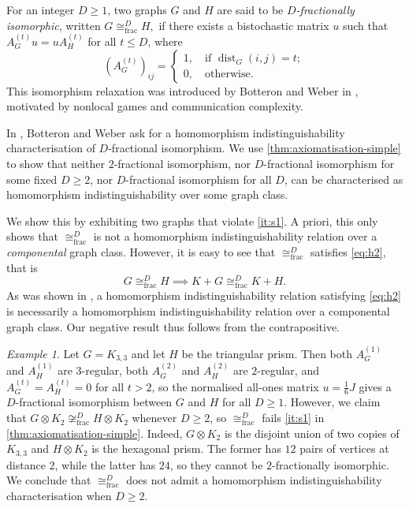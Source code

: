 \documentclass[11pt]{scrartcl}
\theoremstyle{definition}
\theoremstyle{plain}
\theoremstyle{remark}
\newtheorem{plainexample}[definition]{Example}
\newcommand{\opfrac}{{\operatorname{frac}}}
\DeclareMathOperator{\dist}{dist}
\begin{document}
    For an integer $D \geq 1$, two graphs $G$ and $H$ are said to be \emph{$D$-fractionally isomorphic}, written $G \cong_\opfrac^D H,$ if there exists a bistochastic matrix $u$ such that $A_G^{(t)} u = u A_H^{(t)}$ for all $t \leq D$, where
	\[ (A_G^{(t)})_{ij} = \begin{cases}
		1, \quad \text{if $\dist_G(i,j) = t$}; \\
		0, \quad \text{otherwise}.
	\end{cases} \]
    This isomorphism relaxation was introduced by Botteron and Weber in \cite{botteron_communication_2024}, motivated by nonlocal games and communication complexity.

	In \cite[Open Question 2]{botteron_communication_2024}, Botteron and Weber ask for a homomorphism indistinguishability characterisation of $D$\nobreakdash-fractional isomorphism.
	We use \cref{thm:axiomatisation-simple} to show that neither $2$\nobreakdash-fractional isomorphism, nor $D$\nobreakdash-fractional isomorphism for some fixed $D \geq 2$, nor $D$-fractional isomorphism for all $D$, can be characterised as homomorphism indistinguishability over some graph class.
    
    We show this by exhibiting two graphs that violate \cref{it:s1}. A priori, this only shows that $\cong_\opfrac^D$ is not a homomorphism indistinguishability relation over a \emph{componental} graph class. However, it is easy to see that $\cong_\opfrac^D$ satisfies \cref{eq:h2}, that is
    \begin{equation*}
        G \cong_\opfrac^D H \implies K + G \cong_\opfrac^D K + H.
    \end{equation*}
    As was shown in \cite[Theorem~7]{seppelt_logical_2024}, a homomorphism indistinguishability relation satisfying \cref{eq:h2} is necessarily a homomorphism indistinguishability relation over a componental graph class. Our negative result thus follows from the contrapositive.
	
	\begin{plainexample}
		\label{xmpl:D-frac}
		Let $G = K_{3,3}$ and let $H$ be the triangular prism.
		Then both $A_G^{(1)}$ and $A_H^{(1)}$ are $3$-regular, both $A_G^{(2)}$ and $A_H^{(2)}$ are $2$-regular, and $A_G^{(t)} = A_H^{(t)} = 0$ for all $t > 2$, so the normalised all-ones matrix $u = \frac{1}{6} J$ gives a $D$-fractional isomorphism between $G$ and $H$ for all $D \geq 1$.
		However, we claim that $G \otimes K_2 \not \cong_\opfrac^D H \otimes K_2$ whenever $D \geq 2$, so $\cong_\opfrac^D$ fails \cref{it:s1} in \cref{thm:axiomatisation-simple}.
		Indeed, $G \otimes K_2$ is the disjoint union of two copies of $K_{3,3}$ and $H \otimes K_2$ is the hexagonal prism.
		The former has $12$ pairs of vertices at distance $2$, while the latter has $24$, so they cannot be $2$-fractionally isomorphic.
		We conclude that $\cong_\opfrac^D$ does not admit a homomorphism indistinguishability characterisation when $D \geq 2$.
	\end{plainexample}
\end{document}
